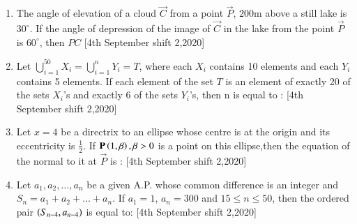 \documentclass[journal]{IEEEtran}
\begin{document}
\begin{enumerate}[start=16]
\item The angle of elevation of a cloud $\vec{C}$ from a point $\vec{P}$, $200$m above a still lake is $30^{\circ}$. If the angle of depression of the image of $\vec{C}$ in the lake from the point $\vec{P}$ is $60^{\circ}$, then $PC$  \hfill{[4th September shift 2,2020]}
\begin{enumerate}
\end{enumerate}

\item Let $\bigcup_{i=1}^{50} X_i = \bigcup_{i=1}^{n} Y_i = T$, where each $X_i$ contains 10 elements and each $Y_i$ contains 5 elements. If each element of the set $T$ is an element of exactly 20 of the sets $X_i$'s and exactly 6 of the sets $Y_i$'s, then  n is equal to : \hfill{[4th September shift 2,2020]}


\begin{enumerate}
\end{enumerate}

\item Let $x=4$ be a directrix to an ellipse whose centre is at the origin and its eccentricity is $\frac{1}{2}$. If $\mathbf{P}\left(1,\beta\right),\beta>0$ is a point on this ellipse,then the equation of the normal to it at $\vec{P}$ is : \hfill{[4th September shift 2,2020]}
\begin{enumerate}
\end{enumerate}

\item Let $a_1, a_2, \ldots, a_n$ be a given A.P. whose common difference is an integer and $S_n = a_1 + a_2 + \ldots + a_n$. If $a_1 = 1$, $a_n = 300$ and $15 \leq n \leq 50$, then the ordered pair  $\left(S_{n-4}, a_{n-4}\right)$ is equal to: \hfill{[4th September shift 2,2020]}


\end{enumerate}
\end{document}
